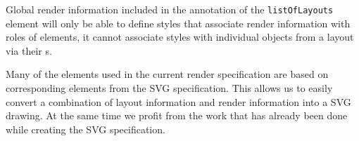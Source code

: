 Global render information included in the annotation of 
the \texttt{listOf\-Layouts} element will only be able to define styles that 
associate render information with roles of elements, it cannot associate 
styles with individual objects from a layout via their s.

Many of the elements used in the current render specification are based on 
corresponding elements from the SVG specification. This allows us to easily convert a combination 
of layout information and render information into a SVG drawing. At the same time we profit 
from the work that has already been done while creating the SVG specification.

